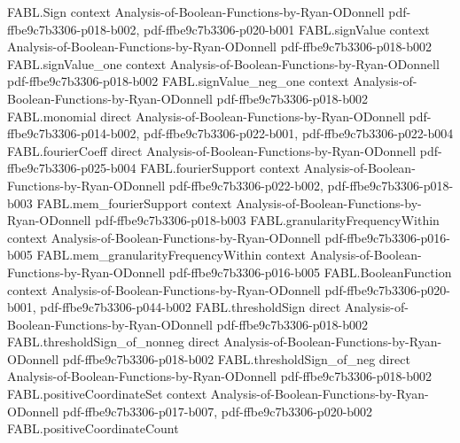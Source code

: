 \begin{theorem}
\label{FABL.sum_fourierCoeff_singleton_eq_expect_mul_sum_signValue}
\leanok
{}
\proofstep
  {FABL.Sign}
  {context}
  {Analysis-of-Boolean-Functions-by-Ryan-ODonnell}
  {pdf-ffbe9c7b3306-p018-b002,
    pdf-ffbe9c7b3306-p020-b001}
\proofstep
  {FABL.signValue}
  {context}
  {Analysis-of-Boolean-Functions-by-Ryan-ODonnell}
  {pdf-ffbe9c7b3306-p018-b002}
\proofstep
  {FABL.signValue_one}
  {context}
  {Analysis-of-Boolean-Functions-by-Ryan-ODonnell}
  {pdf-ffbe9c7b3306-p018-b002}
\proofstep
  {FABL.signValue_neg_one}
  {context}
  {Analysis-of-Boolean-Functions-by-Ryan-ODonnell}
  {pdf-ffbe9c7b3306-p018-b002}
\proofstep
  {FABL.monomial}
  {direct}
  {Analysis-of-Boolean-Functions-by-Ryan-ODonnell}
  {pdf-ffbe9c7b3306-p014-b002,
    pdf-ffbe9c7b3306-p022-b001,
    pdf-ffbe9c7b3306-p022-b004}
\proofstep
  {FABL.fourierCoeff}
  {direct}
  {Analysis-of-Boolean-Functions-by-Ryan-ODonnell}
  {pdf-ffbe9c7b3306-p025-b004}
\proofstep
  {FABL.fourierSupport}
  {context}
  {Analysis-of-Boolean-Functions-by-Ryan-ODonnell}
  {pdf-ffbe9c7b3306-p022-b002,
    pdf-ffbe9c7b3306-p018-b003}
\proofstep
  {FABL.mem_fourierSupport}
  {context}
  {Analysis-of-Boolean-Functions-by-Ryan-ODonnell}
  {pdf-ffbe9c7b3306-p018-b003}
\proofstep
  {FABL.granularityFrequencyWithin}
  {context}
  {Analysis-of-Boolean-Functions-by-Ryan-ODonnell}
  {pdf-ffbe9c7b3306-p016-b005}
\proofstep
  {FABL.mem_granularityFrequencyWithin}
  {context}
  {Analysis-of-Boolean-Functions-by-Ryan-ODonnell}
  {pdf-ffbe9c7b3306-p016-b005}
\proofstep
  {FABL.BooleanFunction}
  {context}
  {Analysis-of-Boolean-Functions-by-Ryan-ODonnell}
  {pdf-ffbe9c7b3306-p020-b001,
    pdf-ffbe9c7b3306-p044-b002}
\proofstep
  {FABL.thresholdSign}
  {direct}
  {Analysis-of-Boolean-Functions-by-Ryan-ODonnell}
  {pdf-ffbe9c7b3306-p018-b002}
\proofstep
  {FABL.thresholdSign_of_nonneg}
  {direct}
  {Analysis-of-Boolean-Functions-by-Ryan-ODonnell}
  {pdf-ffbe9c7b3306-p018-b002}
\proofstep
  {FABL.thresholdSign_of_neg}
  {direct}
  {Analysis-of-Boolean-Functions-by-Ryan-ODonnell}
  {pdf-ffbe9c7b3306-p018-b002}
\proofstep
  {FABL.positiveCoordinateSet}
  {context}
  {Analysis-of-Boolean-Functions-by-Ryan-ODonnell}
  {pdf-ffbe9c7b3306-p017-b007,
    pdf-ffbe9c7b3306-p020-b002}
\proofstep
  {FABL.positiveCoordinateCount}

\end{theorem}
